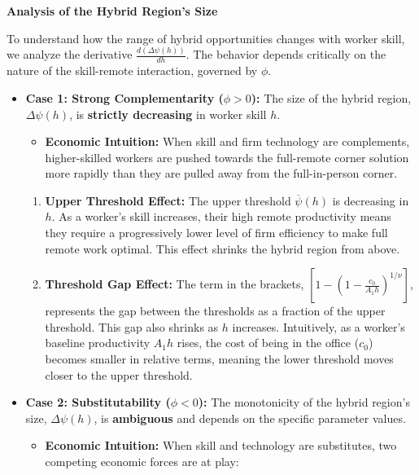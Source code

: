 \documentclass[
  11pt,
  letterpaper,
  DIV=11,
  numbers=noendperiod]{scrartcl}
\providecommand{\tightlist}{%
  \setlength{\itemsep}{0pt}\setlength{\parskip}{0pt}}\usepackage{longtable,booktabs,array}
\begin{document}
\textbf{Analysis of the Hybrid Region's Size}

To understand how the range of hybrid opportunities changes with worker
skill, we analyze the derivative \(\frac{d(\Delta\psi(h))}{dh}\). The
behavior depends critically on the nature of the skill-remote
interaction, governed by \(\phi\).

\begin{itemize}
\tightlist
\item
  \textbf{Case 1: Strong Complementarity (\(\phi > 0\)):} The size of
  the hybrid region, \(\Delta\psi(h)\), is \textbf{strictly decreasing}
  in worker skill \(h\).

  \begin{itemize}
  \tightlist
  \item
    \textbf{Economic Intuition:} When skill and firm technology are
    complements, higher-skilled workers are pushed towards the
    full-remote corner solution more rapidly than they are pulled away
    from the full-in-person corner.
  \end{itemize}

  \begin{enumerate}
  \def\labelenumi{\arabic{enumi}.}
  \tightlist
  \item
    \textbf{Upper Threshold Effect:} The upper threshold
    \(\overline{\psi}(h)\) is decreasing in \(h\). As a worker's skill
    increases, their high remote productivity means they require a
    progressively lower level of firm efficiency to make full remote
    work optimal. This effect shrinks the hybrid region from above.
  \item
    \textbf{Threshold Gap Effect:} The term in the brackets,
    \(\left[ 1 - \left( 1 - \frac{c_0}{A_1 h} \right)^{1/\nu} \right]\),
    represents the gap between the thresholds as a fraction of the upper
    threshold. This gap also shrinks as \(h\) increases. Intuitively, as
    a worker's baseline productivity \(A_1 h\) rises, the cost of being
    in the office (\(c_0\)) becomes smaller in relative terms, meaning
    the lower threshold moves closer to the upper threshold.
  \end{enumerate}
\item
  \textbf{Case 2: Substitutability (\(\phi < 0\)):} The monotonicity of
  the hybrid region's size, \(\Delta\psi(h)\), is \textbf{ambiguous} and
  depends on the specific parameter values.

  \begin{itemize}
  \tightlist
  \item
    \textbf{Economic Intuition:} When skill and technology are
    substitutes, two competing economic forces are at play:


\end{itemize}
\end{itemize}
\end{document}
